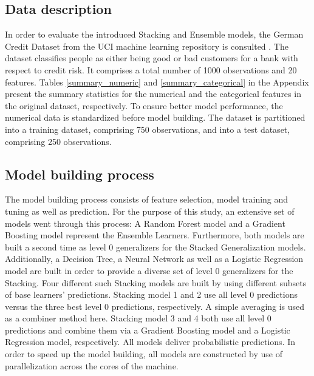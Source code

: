 \documentclass[12pt]{article}
\begin{document}
\subsection{Data description}
In order to evaluate the introduced Stacking and Ensemble models, the German Credit Dataset from the UCI machine learning repository is consulted \citep{dataset}. The dataset classifies people as either being good or bad customers for a bank with respect to credit risk. It comprises a total number of 1000 observations and 20 features. Tables \ref{summary_numeric} and \ref{summary_categorical} in the Appendix present the summary statistics for the numerical and the categorical features in the original dataset, respectively. To ensure better model performance, the numerical data is standardized before model building. The dataset is partitioned into a training dataset, comprising 750 observations, and into a test dataset, comprising 250 observations.





\subsection{Model building process}
The model building process consists of feature selection, model training and tuning as well as prediction. For the purpose of this study, an extensive set of models went through this process: A Random Forest model and a Gradient Boosting model represent the Ensemble Learners. Furthermore, both models are built a second time as level 0 generalizers for the Stacked Generalization models. Additionally, a Decision Tree, a Neural Network as well as a Logistic Regression model are built in order to provide a diverse set of level 0 generalizers for the Stacking. Four different such Stacking models are built by using different subsets of base learners' predictions. Stacking model 1 and 2 use all level 0 predictions versus the three best level 0 predictions, respectively. A simple averaging is used as a combiner method here. Stacking model 3 and 4 both use all level 0 predictions and combine them via a Gradient Boosting model and a Logistic Regression model, respectively. All models deliver probabilistic predictions. In order to speed up the model building, all models are constructed by use of parallelization across the cores of the machine. 
\end{document}
